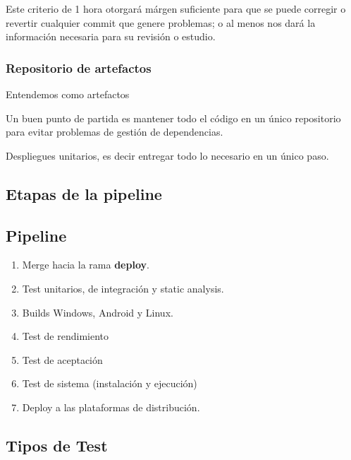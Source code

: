Este criterio de 1 hora otorgará márgen suficiente para que se puede corregir o revertir cualquier commit que genere problemas; o al menos nos dará la información necesaria para su revisión o estudio.

\subsubsection{Repositorio de artefactos}

Entendemos como artefactos

Un buen punto de partida es mantener todo el código en un único repositorio para evitar problemas de gestión de dependencias.

Despliegues unitarios, es decir entregar todo lo necesario en un único paso.

\subsection{Etapas de la pipeline}




\subsection{Pipeline}

\begin{enumerate}
  \item Merge hacia la rama \textbf{deploy}.
  \item Test unitarios, de integración y static analysis.
  \item Builds Windows, Android y Linux.
  \item Test de rendimiento
  \item Test de aceptación
  \item Test de sistema (instalación y ejecución)
  \item Deploy a las plataformas de distribución.
\end{enumerate}



\subsection{Tipos de Test}\label{pipeline:tipos-de-test}

